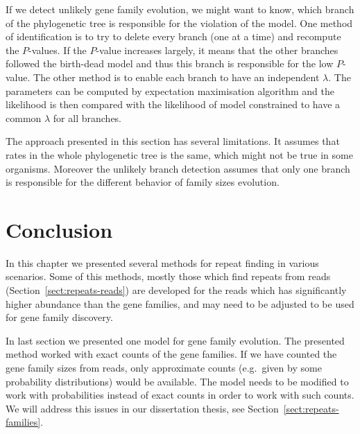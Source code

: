 If we detect unlikely gene family evolution, we might want to know, which branch of the phylogenetic tree is responsible for the violation of the model.
One method of identification is to try to delete every branch (one at a time) and recompute the $P$-values. If the $P$-value increases largely, it means that the other branches followed the birth-dead model and thus this branch is responsible for the low $P$-value.
The other method is to enable each branch to have an independent $\lambda$. The parameters can be computed by expectation maximisation algorithm and the likelihood is then compared with the likelihood of model constrained to have a common $\lambda$ for all branches.

The approach presented in this section has several limitations. It assumes that rates in the whole phylogenetic tree is the same, which might not be true in some organisms. Moreover the unlikely branch detection assumes that only one branch is responsible for the different behavior of family sizes evolution.

\section{Conclusion}

In this chapter we presented several methods for repeat finding in various scenarios.
Some of this methods, mostly those which find repeats from reads (Section~\ref{sect:repeats-reads}) are developed for the reads which has significantly higher abundance than the gene families, and may need to be adjusted to be used for gene family discovery.

In last section we presented one model for gene family evolution. The presented method worked with exact counts of the gene families. If we have counted the gene family sizes from reads, only approximate counts (e.g.\ given by some probability distributions) would be available. The model needs to be modified to work with probabilities instead of exact counts in order to work with such counts.
We will address this issues in our dissertation thesis, see Section~\ref{sect:repeats-families}.
